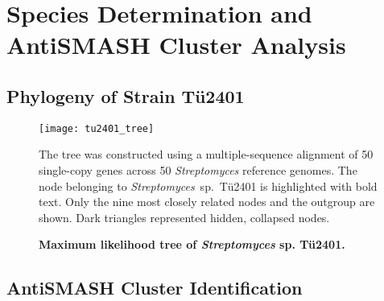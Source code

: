 

\section{Species Determination and AntiSMASH Cluster Analysis} %
\label{sec:species_antismash}

    \subsection{Phylogeny of Strain Tü2401} %
    \label{sub:phylogeny_of_strain_tue2401}

	\begin{figure}[htbp]
		\texttt{[image: tu2401\_tree]}
		\caption[Maximum likelihood tree of \emph{Streptomyces} sp. Tü2401.]{\textbf{Maximum likelihood tree of \emph{Streptomyces} sp. Tü2401.}} The tree was constructed using a multiple-sequence alignment of 50 single-copy genes across 50 \textit{Streptomyces} reference genomes. The node belonging to \textit{Streptomyces}~sp.~Tü2401 is highlighted with bold text. Only the nine most closely related nodes and the outgroup are shown. Dark triangles represented hidden, collapsed nodes.
		\label{fig:phylo_tree} 
	\end{figure}


    \subsection{AntiSMASH Cluster Identification} %
    \label{sub:antismash_cluster_identification}

